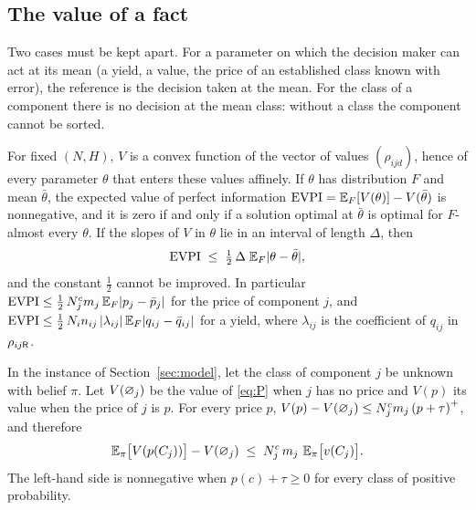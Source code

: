 \subsection{The value of a fact}

Two cases must be kept apart. For a parameter on which the decision maker can act at its mean (a yield, a value,
the price of an established class known with error), the reference is the decision taken at the mean. For the class
of a component there is no decision at the mean class: without a class the component cannot be sorted.

\begin{proposition}\label{prop:evpi}
For fixed $(N,H)$, $V$ is a convex function of the vector of values $(\rho_{ijd})$, hence of every parameter
$\theta$ that enters these values affinely. If $\theta$ has distribution $F$ and mean $\bar\theta$, the expected
value of perfect information $\operatorname{EVPI}=\mathbb{E}_F[V(\theta)]-V(\bar\theta)$ is nonnegative, and it is zero if and only if a
solution optimal at $\bar\theta$ is optimal for $F$-almost every $\theta$. If the slopes of $V$ in $\theta$ lie in
an interval of length $\Delta$, then
\begin{equation}\label{eq:evpi}
\operatorname{EVPI}\;\le\;\tfrac12\,\Delta\;\mathbb{E}_F|\theta-\bar\theta|,
\end{equation}
and the constant $\tfrac12$ cannot be improved. In particular
$\operatorname{EVPI}\le\tfrac12\,N^{c}_jm_j\,\mathbb{E}_F|p_j-\bar p_j|$ for the price of component $j$, and
$\operatorname{EVPI}\le\tfrac12\,N_in_{ij}\,|\lambda_{ij}|\,\mathbb{E}_F|q_{ij}-\bar q_{ij}|$ for a yield, where $\lambda_{ij}$ is the
coefficient of $q_{ij}$ in $\rho_{ij\mathsf{R}}$.
\end{proposition}

\begin{proposition}\label{prop:class}
In the instance of Section~\ref{sec:model}, let the class of component $j$ be unknown with belief $\pi$. Let
$V(\varnothing_j)$ be the value of \eqref{eq:P} when $j$ has no price and $V(p)$ its value when the price of $j$ is $p$.
For every price $p$, $V(p)-V(\varnothing_j)\le N^{c}_jm_j\left(p+\tau\right)^{+}$, and therefore
\begin{equation}\label{eq:class}
\E_\pi\big[V(p(C_j))\big]-V(\out_j)\;\le\;N^{c}_j\,m_j\ \E_\pi\big[v(C_j)\big].
\end{equation}
The left-hand side is nonnegative when $p(c)+\tau\ge0$ for every class of positive probability.
\end{proposition}

